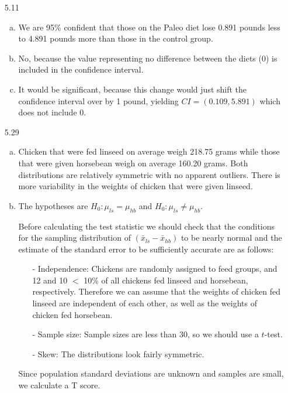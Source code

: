\documentclass[11pt]{article}
\begin{document}
\begin{enumerate}

\item[5.11]
\begin{enumerate}[(a)]
\item We are 95\% confident that those on the Paleo diet lose 0.891 pounds less to 4.891 pounds more than those in the control group.
\item No, because the value representing no difference between the diets (0) is included in the confidence interval.
\item It would be significant, because this change would just shift the confidence interval over by 1 pound, yielding $CI = (0.109, 5.891)$ which does not include 0.
\end{enumerate}

%

\item[5.29]
\begin{enumerate}[(a)]

\item Chicken that were fed linseed on average weigh 218.75 grams while those that were given horsebean weigh on average 160.20 grams. Both distributions are relatively symmetric with no apparent outliers. There is more variability in the weights of chicken that were given linseed.

\item The hypotheses are $H_0: \mu_{ls} = \mu_{hb}$ and $H_0: \mu_{ls} \ne \mu_{hb}$.

Before calculating the test statistic we should check that the conditions for the sampling distribution of $(\bar{x}_{ls} - \bar{x}_{hb})$ to be nearly normal and the estimate of the standard error to be sufficiently accurate are as follows: 
\begin{itemize}
\item[-] Independence: Chickens are randomly assigned to feed groups, and 12 and 10 $<$ 10\% of all chickens fed linseed and horsebean, respectively. Therefore we can assume that the weights of chicken fed linseed are independent of each other, as well as the weights of chicken fed horsebean.
\item[-] Sample size: Sample sizes are less than 30, so we should use a $t$-test.
\item[-] Skew: The distributions look fairly symmetric.
\end{itemize}

Since population standard deviations are unknown and samples are small, we calculate a T score.


\end{enumerate}
\end{enumerate}
\end{document}
